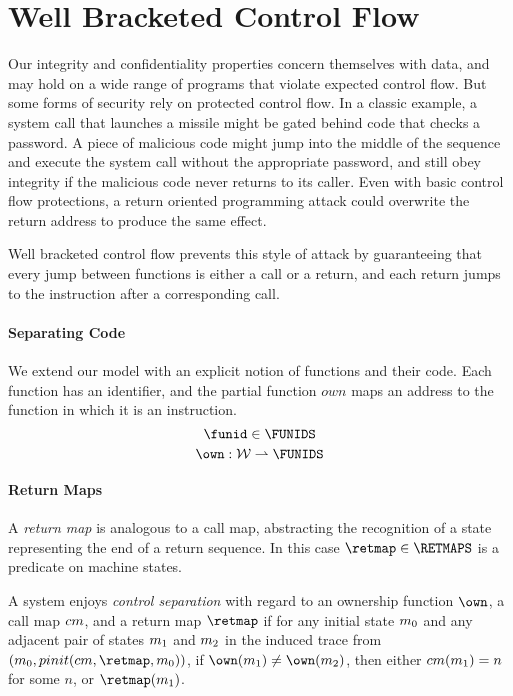 \documentclass[acmsmall,review,anonymous]{acmart}\settopmatter{printfolios=true,printccs=false,printacmref=false}
\begin{document}
\section{Well Bracketed Control Flow}

  Our integrity and confidentiality properties concern themselves with data,
  and may hold on a wide range of programs that violate expected control flow.
  But some forms of security rely on protected control flow. In a classic
  example, a system call that launches a missile might be gated behind code
  that checks a password. A piece of malicious code might jump into the middle
  of the sequence and execute the system call without the appropriate password,
  and still obey integrity if the malicious code never returns to its caller.
  Even with basic control flow protections, a return oriented programming
  attack could overwrite the return address to produce the same effect.

  Well bracketed control flow prevents this style of attack by guaranteeing
  that every jump between functions is either a call or a return, and each
  return jumps to the instruction after a corresponding call.

  \paragraph*{Separating Code}

    We extend our model with an explicit notion of functions and their code.
    Each function has an identifier, and the partial function \(\mathit{own}\)
    maps an address to the function in which it is an instruction.
    \[\funid \in \FUNIDS\]
    \[\own:\WORDS \rightharpoonup \FUNIDS\]

  \paragraph*{Return Maps}
  
    A {\em return map} is analogous to a call map, abstracting the recognition
    of a state representing the end of a return sequence. In this case
    \(\retmap \in \RETMAPS\) is a predicate on machine states.


    A system enjoys {\em control separation} with regard to an ownership
    function \(\own\), a call map \(cm\), and a return map \(\retmap\)
    if for any initial state \(m_0\) and any adjacent pair of states
    \(m_1\) and \(m_2\) in the induced trace from
    \(\mpstate{\mach_0}{\pinit(\callmap,\retmap,\mach_0)}\), if \(\own(\mach_1)
    \not = \own(\mach_2)\), then either \(cm(m_1) = n\) for some
    \(n\), or \(\retmap(\mach_1)\).
\end{document}
